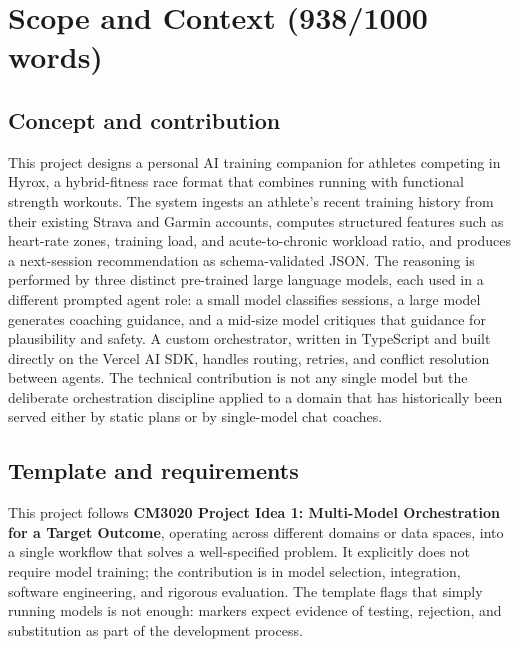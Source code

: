 
\chapter{Scope and Context (938/1000 words)}
\label{ch:introduction}

\section{Concept and contribution}

This project designs a personal AI training companion for athletes competing in Hyrox, a hybrid-fitness race format that combines running with functional strength workouts. The system ingests an athlete's recent training history from their existing Strava and Garmin accounts, computes structured features such as heart-rate zones, training load, and acute-to-chronic workload ratio, and produces a next-session recommendation as schema-validated JSON. The reasoning is performed by three distinct pre-trained large language models, each used in a different prompted agent role: a small model classifies sessions, a large model generates coaching guidance, and a mid-size model critiques that guidance for plausibility and safety. A custom orchestrator, written in TypeScript and built directly on the Vercel AI SDK, handles routing, retries, and conflict resolution between agents. The technical contribution is not any single model but the deliberate orchestration discipline applied to a domain that has historically been served either by static plans or by single-model chat coaches.

\section{Template and requirements}

This project follows \textbf{CM3020 Project Idea 1: Multi-Model Orchestration for a Target Outcome}, operating across different domains or data spaces, into a single workflow that solves a well-specified problem. It explicitly does not require model training; the contribution is in model selection, integration, software engineering, and rigorous evaluation. The template flags that simply running models is not enough: markers expect evidence of testing, rejection, and substitution as part of the development process.

